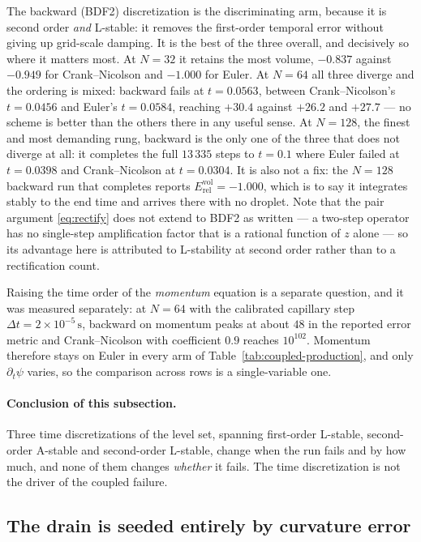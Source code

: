 \documentclass[preprint,3p,11pt]{elsarticle}
\newcommand{\psilev}{\psi}
\begin{document}
The backward (BDF2) discretization is the discriminating arm, because it is
second order \emph{and} L-stable: it removes the first-order temporal error
without giving up grid-scale damping. It is the best of the three overall, and
decisively so where it matters most. At $N=32$ it retains the most volume,
$-0.837$ against $-0.949$ for Crank--Nicolson and $-1.000$ for Euler. At $N=64$
all three diverge and the ordering is mixed: backward fails at $t=0.0563$,
between Crank--Nicolson's $t=0.0456$ and Euler's $t=0.0584$, reaching $+30.4$
against $+26.2$ and $+27.7$ --- no scheme is better than the others there in any
useful sense. At $N=128$, the finest and most demanding rung, backward is the
only one of the three that does not diverge at all: it completes the full
$13\,335$ steps to $t=0.1$ where Euler failed at $t=0.0398$ and Crank--Nicolson
at $t=0.0304$. It is also not a fix: the $N=128$
backward run that completes reports
$E^{\mathrm{vol}}_{\mathrm{rel}} = -1.000$, which is to say it integrates
stably to the end time and arrives there with no droplet. Note that the pair
argument \eqref{eq:rectify} does not extend to BDF2 as written --- a two-step
operator has no single-step amplification factor that is a rational function of
$z$ alone --- so its advantage here is attributed to L-stability at second order
rather than to a rectification count.

Raising the time order of the \emph{momentum} equation is a separate question,
and it was measured separately: at $N=64$ with the calibrated capillary step
$\Delta t = 2\times10^{-5}\,\mathrm{s}$, backward on momentum peaks at about
$48$ in the reported error metric and Crank--Nicolson with coefficient $0.9$
reaches $10^{102}$.
Momentum therefore stays on Euler in every arm of
Table~\ref{tab:coupled-production}, and only $\partial_t\psilev$ varies, so the
comparison across rows is a single-variable one.

\paragraph{Conclusion of this subsection.} Three time discretizations of the
level set, spanning first-order L-stable, second-order A-stable and second-order
L-stable, change when the run fails and by how much, and none of them changes
\emph{whether} it fails. The time discretization is not the driver of the coupled
failure.

\subsection{The drain is seeded entirely by curvature error}
\label{sec:coupled-headline}
\end{document}
